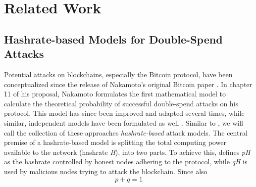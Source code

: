 \documentclass[a4paper,12pt,twoside]{report}
\begin{document}

\chapter{Related Work} \label{relatedwork}
\section{Hashrate-based Models for Double-Spend Attacks}
Potential attacks on blockchains, especially the Bitcoin protocol, have been conceptualized since the release of Nakamoto's original Bitcoin paper \cite{nakamoto2008bitcoin}. In chapter 11 of his proposal, Nakamoto formulates the first mathematical model to calculate the theoretical probability of successful double-spend attacks on his protocol. This model has since been improved and adapted several times, while similar, independent models have been formulated as well \cite{HBDSA,DSAwithTime,NakamotoDSACorrection,NakamotoExplMCSim}. Similar to \cite{DSAwithTime}, we will call the collection of these approaches \textit{hashrate-based} attack models. The central premise of a hashrate-based model is splitting the total computing power available to the network (hashrate \textit{H}), into two parts. To achieve this, \cite{HBDSA} defines \textit{pH} as the hashrate controlled by honest nodes adhering to the protocol, while \textit{qH} is used by malicious nodes trying to attack the blockchain. Since also
\begin{equation}
p + q = 1
\end{equation}
\end{document}
